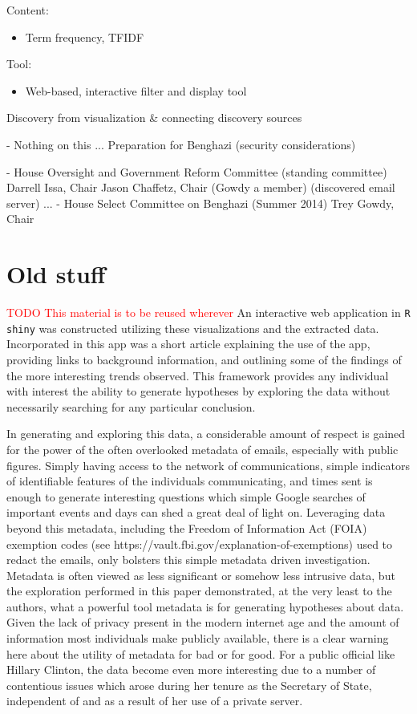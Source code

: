 \documentclass[journal]{vgtc}                %
\newcommand*{\TODO}[1]{\textcolor{red}{TODO #1}}
\begin{document}
   
 Content:
\begin{itemize}
\item Term frequency, TFIDF
\end{itemize}

   
 Tool: 
\begin{itemize}
\item Web-based, interactive filter and display tool
\end{itemize}
    
    
Discovery from visualization \& connecting discovery sources



- Nothing on this ... Preparation for Benghazi (security considerations)

- House Oversight and Government Reform Committee (standing committee) 
  Darrell Issa, Chair
     Jason Chaffetz, Chair (Gowdy a member)
  (discovered email server)
    ... 
- House Select Committee on Benghazi (Summer 2014) 
   Trey Gowdy, Chair

\section{Old stuff}
\TODO{This material is to be reused wherever}
An interactive web application in \texttt{R} \texttt{shiny} was constructed utilizing these visualizations and the extracted data. Incorporated in this app was a short article explaining the use of the app, providing links to background information, and outlining some of the findings of the more interesting trends observed. This framework provides any individual with interest the ability to generate hypotheses by exploring the data without necessarily searching for any particular conclusion. 

In generating and exploring this data, a considerable amount of respect is gained for the power of the often overlooked metadata of emails, especially with public figures. Simply having access to the network of communications, simple indicators of identifiable features of the individuals communicating, and times sent is enough to generate interesting questions which simple Google searches of important events and days can shed a great deal of light on. Leveraging data beyond this metadata, including the Freedom of Information Act (FOIA) exemption codes (see https://vault.fbi.gov/explanation-of-exemptions) used to redact the emails, only bolsters this simple metadata driven investigation. Metadata is often viewed as less significant or somehow less intrusive data, but the exploration performed in this paper demonstrated, at the very least to the authors, what a powerful tool metadata is for generating hypotheses about data. Given the lack of privacy present in the modern internet age and the amount of information most individuals make publicly available, there is a clear warning here about the utility of metadata for bad or for good. For a public official like Hillary Clinton, the data become even more interesting due to a number of contentious issues which arose during her tenure as the Secretary of State, independent of and as a result of her use of a private server.
\end{document}
